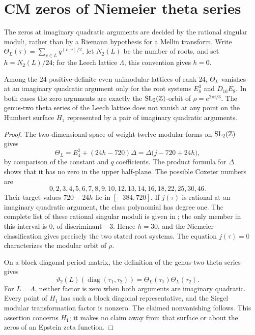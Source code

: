 \section{CM zeros of Niemeier theta series}
The zeros at imaginary quadratic arguments are decided by the rational
singular moduli, rather than by a Riemann hypothesis for a Mellin transform.
Write
\(\Theta_L(\tau)=\sum_{v\in L}q^{(v,v)/2}\), let \(N_2(L)\) be the
number of roots, and set \(h=N_2(L)/24\); for the Leech lattice
\(\Lambda\), this convention gives \(h=0\).

\begin{theorem}\label{thm:cm-theta-zeros}
Among the \(24\) positive-definite even unimodular lattices of rank \(24\),
\(\Theta_L\) vanishes at an imaginary quadratic argument only for
the root systems \(E_8^3\) and \(D_{16}E_8\). In both cases the
zero arguments are exactly the \(\mathrm{SL}_2(\mathbb Z)\)-orbit of
\(\rho=e^{2\pi i/3}\).
The genus-two theta series of the Leech lattice does not vanish at
any point on the Humbert surface \(H_1\) represented by a pair
of imaginary quadratic arguments.
\end{theorem}
\begin{proof}
The two-dimensional space of weight-twelve modular forms on
\(\mathrm{SL}_2(\mathbb Z)\) gives
\begin{equation}\label{eq:niemeier-j}
 \Theta_L=E_4^3+(24h-720)\Delta
          =\Delta\bigl(j-720+24h\bigr),
\end{equation}
by comparison of the constant and \(q\) coefficients.
The product formula for \(\Delta\) shows that it has no zero in
the upper half-plane. The possible Coxeter numbers are
\[
 0,2,3,4,5,6,7,8,9,10,12,13,14,16,18,22,25,30,46.
\]
Their target values \(720-24h\) lie in \([-384,720]\).
If \(j(\tau)\) is rational at an imaginary quadratic argument,
the class polynomial has degree one. The complete list of these
rational singular moduli is given in
\cite[Table~1, p.~1057]{BLM2017}; the only member in this interval
is \(0\), of discriminant \(-3\).
Hence \(h=30\), and the Niemeier classification gives precisely
the two stated root systems. The equation \(j(\tau)=0\)
characterizes the modular orbit of \(\rho\).

On a block diagonal period matrix,
the definition of the genus-two theta series gives
\[
 \vartheta_2(L)(\operatorname{diag}(\tau_1,\tau_2))
       =\Theta_L(\tau_1)\Theta_L(\tau_2).
\]
For \(L=\Lambda\), neither factor is zero when both arguments
are imaginary quadratic. Every point of \(H_1\) has such a
block diagonal representative, and the Siegel modular transformation
factor is nonzero. The claimed nonvanishing follows.
This assertion concerns \(H_1\); it makes no claim away from that
surface or about the zeros of an Epstein zeta function.
\end{proof}

